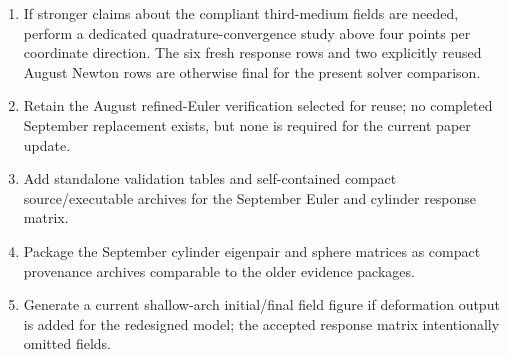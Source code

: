 \documentclass[11pt]{article}
\begin{document}
\begin{enumerate}
  \item If stronger claims about the compliant third-medium fields are needed, perform a dedicated quadrature-convergence study above four points per coordinate direction.  The six fresh response rows and two explicitly reused August Newton rows are otherwise final for the present solver comparison.
  \item Retain the August refined-Euler verification selected for reuse; no completed September replacement exists, but none is required for the current paper update.
  \item Add standalone validation tables and self-contained compact source/executable archives for the September Euler and cylinder response matrix.
  \item Package the September cylinder eigenpair and sphere matrices as compact provenance archives comparable to the older evidence packages.
  \item Generate a current shallow-arch initial/final field figure if deformation output is added for the redesigned model; the accepted response matrix intentionally omitted fields.
\end{enumerate}
\end{document}
